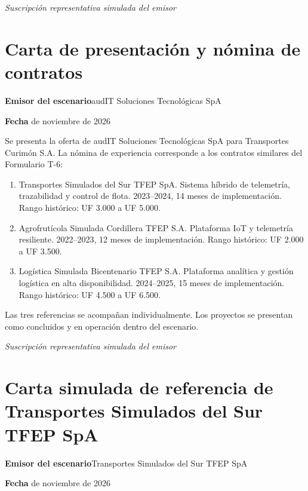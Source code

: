 \medskip
\noindent\textit{Suscripción representativa simulada del emisor}\par
\label{adm:capacidad-fin}

\clearpage
\section*{Carta de presentación y nómina de contratos}\label{adm:carta}

\rotuloSimuladoSobreUno
\noindent\textbf{Emisor del escenario}\enspace audIT Soluciones Tecnológicas SpA\par
\noindent\textbf{Fecha} de noviembre de 2026\par
\medskip

Se presenta la oferta de audIT Soluciones Tecnológicas SpA para Transportes Curimón S.A. La nómina de experiencia corresponde a los contratos similares del Formulario T-6:
\begin{enumerate}
\item Transportes Simulados del Sur TFEP SpA. Sistema híbrido de telemetría, trazabilidad y control de flota. 2023--2024, 14 meses de implementación. Rango histórico: UF 3.000 a UF 5.000.
\item Agrofrutícola Simulada Cordillera TFEP S.A. Plataforma IoT y telemetría resiliente. 2022--2023, 12 meses de implementación. Rango histórico: UF 2.000 a UF 3.500.
\item Logística Simulada Bicentenario TFEP S.A. Plataforma analítica y gestión logística en alta disponibilidad. 2024--2025, 15 meses de implementación. Rango histórico: UF 4.500 a UF 6.500.
\end{enumerate}
Las tres referencias se acompañan individualmente. Los proyectos se presentan como concluidos y en operación dentro del escenario.

\medskip
\noindent\textit{Suscripción representativa simulada del emisor}\par
\label{adm:carta-fin}

\clearpage
\section*{Carta simulada de referencia de Transportes Simulados del Sur TFEP SpA}\label{adm:ref-sur}

\rotuloSimuladoSobreUno
\noindent\textbf{Emisor del escenario}\enspace Transportes Simulados del Sur TFEP SpA\par
\noindent\textbf{Fecha} de noviembre de 2026\par
\medskip

